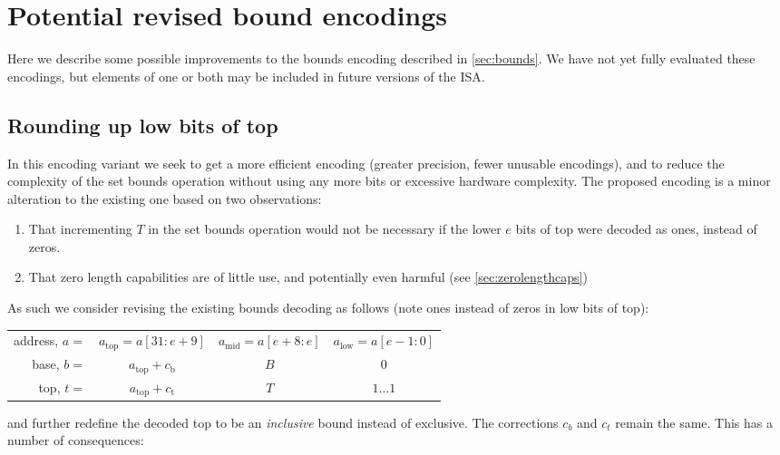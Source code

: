 \chapter{Potential revised bound encodings}

Here we describe some possible improvements to the bounds encoding described in \cref{sec:bounds}.
We have not yet fully evaluated these encodings, but elements of one or both may be included in future versions of the ISA.

\section{Rounding up low bits of top}

In this encoding variant we seek to get a more efficient encoding (greater precision, fewer unusable encodings), and to reduce the complexity of the set bounds operation without using any more bits or excessive hardware complexity.
The proposed encoding is a minor alteration to the existing one based on two observations:
\begin{enumerate}
\item That incrementing $T$ in the set bounds operation would not be necessary if the lower $e$ bits of top were decoded as ones, instead of zeros.
\item That zero length capabilities are of little use, and potentially even harmful (see \cref{sec:zerolengthcaps})
\end{enumerate}
As such we consider revising the existing bounds decoding as follows (note ones instead of zeros in low bits of top):
\begin{center}
{
\renewcommand{\arraystretch}{1.5}
\begin{tabular}{r|c|c|c|}
\cline{2-4}
address, $a =$ & $a_\text{top} = a[31:e+9]$ & $a_\text{mid} = a[e+8:e]$  & $a_\text{low} = a[e-1:0]$ \\ \cline{2-4}
base, $b =$    & $a_\text{top}+c_\text{b}$   & $B $ & $0$ \\ \cline{2-4}
top, $t =$     & $a_\text{top}+c_\text{t}$   & $T $ & $1\dots{}1$ \\ \cline{2-4}
\end{tabular}
}
\end{center}
and further redefine the decoded top to be an \emph{inclusive} bound instead of exclusive.
The corrections $c_b$ and $c_t$ remain the same.
This has a number of consequences:
